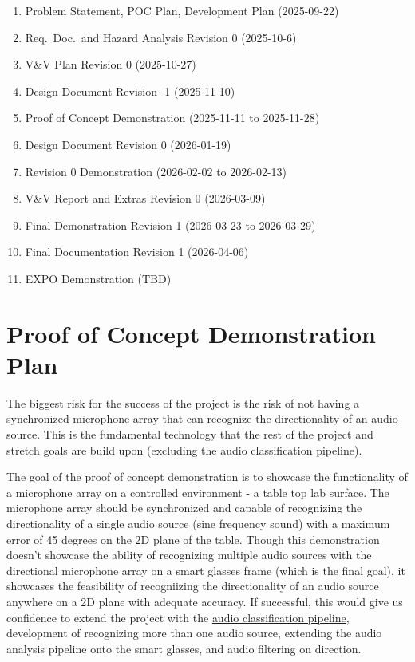 \documentclass{article}
\begin{document}
\begin{enumerate}
  \item Problem Statement, POC Plan, Development Plan (2025-09-22)
  \item Req.\ Doc.\ and Hazard Analysis Revision 0 (2025-10-6)
  \item V\&V Plan Revision 0 (2025-10-27)
  \item Design Document Revision -1 (2025-11-10)
  \item Proof of Concept Demonstration (2025-11-11 to 2025-11-28)
  \item Design Document Revision 0 (2026-01-19)
  \item Revision 0 Demonstration (2026-02-02 to 2026-02-13)
  \item V\&V Report and Extras Revision 0 (2026-03-09)
  \item Final Demonstration Revision 1 (2026-03-23 to 2026-03-29)
  \item Final Documentation Revision 1 (2026-04-06)
  \item EXPO Demonstration (TBD)
\end{enumerate}

\section{Proof of Concept Demonstration Plan}

The biggest risk for the success of the project is the risk of not having a
synchronized microphone array that can recognize the directionality of an audio
source. This is the fundamental technology that the rest of the project and
stretch goals are build upon (excluding the audio classification pipeline).

The goal of the proof of concept demonstration is to showcase the functionality
of a microphone array on a controlled environment - a table top lab surface. The
microphone array should be synchronized and capable of recognizing the
directionality of a single audio source (sine frequency sound) with a maximum
error of 45 degrees on the 2D plane of the table. Though this demonstration
doesn't showcase the ability of recognizing multiple audio sources with the
directional microphone array on a smart glasses frame (which is the final goal),
it showcases the feasibility of recogniizing the directionality of an audio
source anywhere on a 2D plane with adequate accuracy. If successful, this would
give us confidence to extend the project with the
\hyperlink{audio_classification_pipeline}{audio classification pipeline},
development of recognizing more than one audio source, extending the audio
analysis pipeline onto the smart glasses, and audio filtering on direction. 
\end{document}
